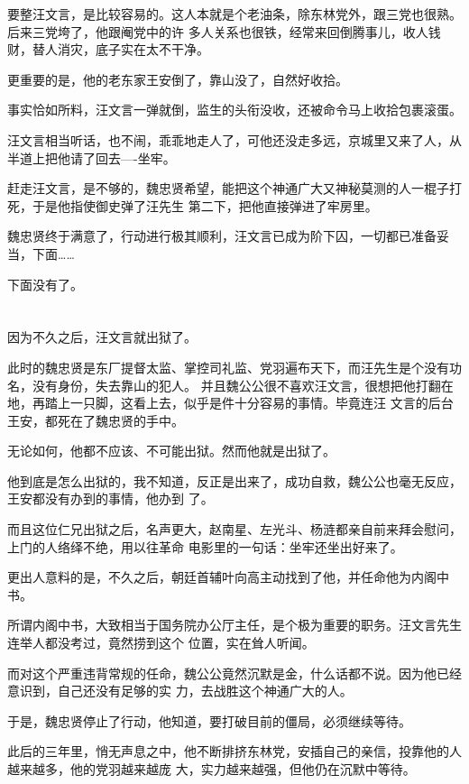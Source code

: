 \documentclass[11pt,a4paper,onecolumn]{article}
\begin{document}
要整汪文言，是比较容易的。这人本就是个老油条，除东林党外，跟三党也很熟。后来三党垮了，他跟阉党中的许
多人关系也很铁，经常来回倒腾事儿，收人钱财，替人消灾，底子实在太不干净。

更重要的是，他的老东家王安倒了，靠山没了，自然好收拾。

事实恰如所料，汪文言一弹就倒，监生的头衔没收，还被命令马上收拾包裹滚蛋。

汪文言相当听话，也不闹，乖乖地走人了，可他还没走多远，京城里又来了人，从半道上把他请了回去----坐牢。

赶走汪文言，是不够的，魏忠贤希望，能把这个神通广大又神秘莫测的人一棍子打死，于是他指使御史弹了汪先生
第二下，把他直接弹进了牢房里。

魏忠贤终于满意了，行动进行极其顺利，汪文言已成为阶下囚，一切都已准备妥当，下面……

下面没有了。

\section[\thesection]{}

因为不久之后，汪文言就出狱了。

此时的魏忠贤是东厂提督太监、掌控司礼监、党羽遍布天下，而汪先生是个没有功名，没有身份，失去靠山的犯人。
并且魏公公很不喜欢汪文言，很想把他打翻在地，再踏上一只脚，这看上去，似乎是件十分容易的事情。毕竟连汪
文言的后台王安，都死在了魏忠贤的手中。

无论如何，他都不应该、不可能出狱。然而他就是出狱了。

他到底是怎么出狱的，我不知道，反正是出来了，成功自救，魏公公也毫无反应，王安都没有办到的事情，他办到
了。

而且这位仁兄出狱之后，名声更大，赵南星、左光斗、杨涟都亲自前来拜会慰问，上门的人络绎不绝，用以往革命
电影里的一句话：坐牢还坐出好来了。

更出人意料的是，不久之后，朝廷首辅叶向高主动找到了他，并任命他为内阁中书。

所谓内阁中书，大致相当于国务院办公厅主任，是个极为重要的职务。汪文言先生连举人都没考过，竟然捞到这个
位置，实在耸人听闻。

而对这个严重违背常规的任命，魏公公竟然沉默是金，什么话都不说。因为他已经意识到，自己还没有足够的实
力，去战胜这个神通广大的人。

于是，魏忠贤停止了行动，他知道，要打破目前的僵局，必须继续等待。

此后的三年里，悄无声息之中，他不断排挤东林党，安插自己的亲信，投靠他的人越来越多，他的党羽越来越庞
大，实力越来越强，但他仍在沉默中等待。
\end{document}
